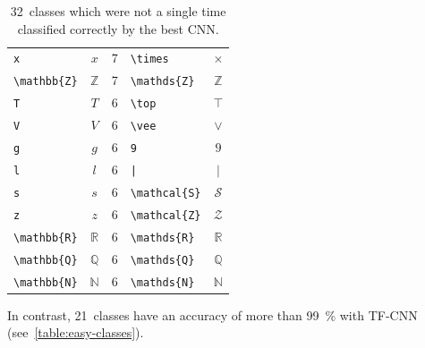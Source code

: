 \begin{table}[h]
\begin{tabular}{lcrlc}
    \verb+x+ & $x$ & 7 & \verb+\times+ & $\times$ \\
    \verb+\mathbb{Z}+ & $\mathbb{Z}$ & 7 & \verb+\mathds{Z}+ & $\mathds{Z}$ \\
    \verb+T+ & $T$ & 6 & \verb+\top+ & $\top$ \\
    \verb+V+ & $V$ & 6 & \verb+\vee+ & $\vee$ \\
    \verb+g+ & $g$ & 6 & \verb+9+ & $9$ \\
    \verb+l+ & $l$ & 6 & \verb+|+ & $|$ \\
    \verb+s+ & $s$ & 6 & \verb+\mathcal{S}+ & $\mathcal{S}$ \\
    \verb+z+ & $z$ & 6 & \verb+\mathcal{Z}+ & $\mathcal{Z}$ \\
    \verb+\mathbb{R}+ & $\mathbb{R}$ & 6 & \verb+\mathds{R}+ & $\mathds{R}$ \\
    \verb+\mathbb{Q}+ & $\mathbb{Q}$ & 6 & \verb+\mathds{Q}+ & $\mathds{Q}$ \\
    \verb+\mathbb{N}+ & $\mathbb{N}$ & 6 & \verb+\mathds{N}+ & $\mathds{N}$ \\
    \bottomrule
    \end{tabular}
    \caption{32~classes which were not a single time classified correctly by
             the best CNN.}
    \label{table:hard-classes}
\end{table}

In contrast, 21~classes have an accuracy of more than \SI{99}{\percent} with
TF-CNN (see~\cref{table:easy-classes}).

